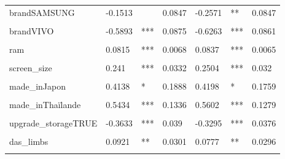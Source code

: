 \documentclass[
  12pt,
]{report}
\begin{document}
\begin{table}[!h]
\begin{tabular}[t]{lllllll}
brandSAMSUNG & -0.1513 &  & 0.0847 & -0.2571 & ** & 0.0847\\
\cellcolor{gray!6}{brandSONY} & \cellcolor{gray!6}{-0.356} & \cellcolor{gray!6}{**} & \cellcolor{gray!6}{0.1154} & \cellcolor{gray!6}{-0.4151} & \cellcolor{gray!6}{***} & \cellcolor{gray!6}{0.1127}\\
brandVIVO & -0.5893 & *** & 0.0875 & -0.6263 & *** & 0.0861\\
\cellcolor{gray!6}{brandXIAOMI} & \cellcolor{gray!6}{-0.7591} & \cellcolor{gray!6}{***} & \cellcolor{gray!6}{0.0561} & \cellcolor{gray!6}{-0.7933} & \cellcolor{gray!6}{***} & \cellcolor{gray!6}{0.0559}\\
\addlinespace
ram & 0.0815 & *** & 0.0068 & 0.0837 & *** & 0.0065\\
\cellcolor{gray!6}{inductionTRUE} & \cellcolor{gray!6}{0.2724} & \cellcolor{gray!6}{***} & \cellcolor{gray!6}{0.0365} & \cellcolor{gray!6}{0.289} & \cellcolor{gray!6}{***} & \cellcolor{gray!6}{0.0361}\\
screen\_size & 0.241 & *** & 0.0332 & 0.2504 & *** & 0.032\\
\cellcolor{gray!6}{made\_inInde} & \cellcolor{gray!6}{-0.2249} & \cellcolor{gray!6}{} & \cellcolor{gray!6}{0.2332} & \cellcolor{gray!6}{-0.1278} & \cellcolor{gray!6}{} & \cellcolor{gray!6}{0.2268}\\
made\_inJapon & 0.4138 & * & 0.1888 & 0.4198 & * & 0.1759\\
\addlinespace
\cellcolor{gray!6}{made\_inTaïwan} & \cellcolor{gray!6}{0.4755} & \cellcolor{gray!6}{*} & \cellcolor{gray!6}{0.2336} & \cellcolor{gray!6}{0.5157} & \cellcolor{gray!6}{*} & \cellcolor{gray!6}{0.2204}\\
made\_inThaïlande & 0.5434 & *** & 0.1336 & 0.5602 & *** & 0.1279\\
\cellcolor{gray!6}{made\_inViêt Nam} & \cellcolor{gray!6}{-0.1489} & \cellcolor{gray!6}{**} & \cellcolor{gray!6}{0.0531} & \cellcolor{gray!6}{-0.09} & \cellcolor{gray!6}{} & \cellcolor{gray!6}{0.0515}\\
upgrade\_storageTRUE & -0.3633 & *** & 0.039 & -0.3295 & *** & 0.0376\\
\cellcolor{gray!6}{das\_head} & \cellcolor{gray!6}{-0.209} & \cellcolor{gray!6}{***} & \cellcolor{gray!6}{0.0612} & \cellcolor{gray!6}{-0.1986} & \cellcolor{gray!6}{***} & \cellcolor{gray!6}{0.059}\\
\addlinespace
das\_limbs & 0.0921 & ** & 0.0301 & 0.0777 & ** & 0.0296\\
\cellcolor{gray!6}{das\_chest} & \cellcolor{gray!6}{-0.2993} & \cellcolor{gray!6}{**} & \cellcolor{gray!6}{0.0945} & \cellcolor{gray!6}{-0.1706} & \cellcolor{gray!6}{**} & \cellcolor{gray!6}{0.0558}\\

\end{tabular}
\end{table}
\end{document}
